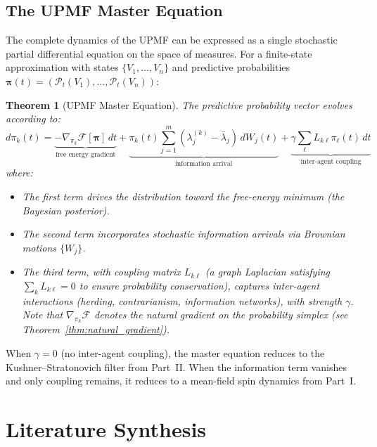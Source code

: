 \documentclass[12pt,a4paper]{article}
\newtheorem{theorem}{Theorem}[section]
\theoremstyle{definition}
\newcommand{\PP}{\mathcal{P}}
\begin{document}
\subsection{The UPMF Master Equation}

The complete dynamics of the UPMF can be expressed as a single stochastic partial differential equation on the space of measures. For a finite-state approximation with states $\{V_1, \ldots, V_n\}$ and predictive probabilities $\boldsymbol{\pi}(t) = (\PP_t(V_1), \ldots, \PP_t(V_n))$:

\begin{theorem}[UPMF Master Equation]\label{thm:master}
The predictive probability vector evolves according to:
\begin{equation}\label{eq:master}
    d\pi_k(t) = \underbrace{-\nabla_{\pi_k} \mathcal{F}[\boldsymbol{\pi}] \, dt}_{\text{free energy gradient}} + \underbrace{\pi_k(t) \sum_{j=1}^m (\lambda_j^{(k)} - \bar{\lambda}_j) \, dW_j(t)}_{\text{information arrival}} + \underbrace{\gamma \sum_\ell L_{k\ell} \pi_\ell(t) \, dt}_{\text{inter-agent coupling}}
\end{equation}
where:
\begin{itemize}
    \item The first term drives the distribution toward the free-energy minimum (the Bayesian posterior).
    \item The second term incorporates stochastic information arrivals via Brownian motions $\{W_j\}$.
    \item The third term, with coupling matrix $L_{k\ell}$ (a graph Laplacian satisfying $\sum_k L_{k\ell} = 0$ to ensure probability conservation), captures inter-agent interactions (herding, contrarianism, information networks), with strength $\gamma$. Note that $\nabla_{\pi_k} \mathcal{F}$ denotes the natural gradient on the probability simplex (see Theorem~\ref{thm:natural_gradient}).
\end{itemize}
\end{theorem}

When $\gamma = 0$ (no inter-agent coupling), the master equation reduces to the Kushner--Stratonovich filter from Part~II. When the information term vanishes and only coupling remains, it reduces to a mean-field spin dynamics from Part~I.



\section{Literature Synthesis}\label{sec:literature}
\end{document}
